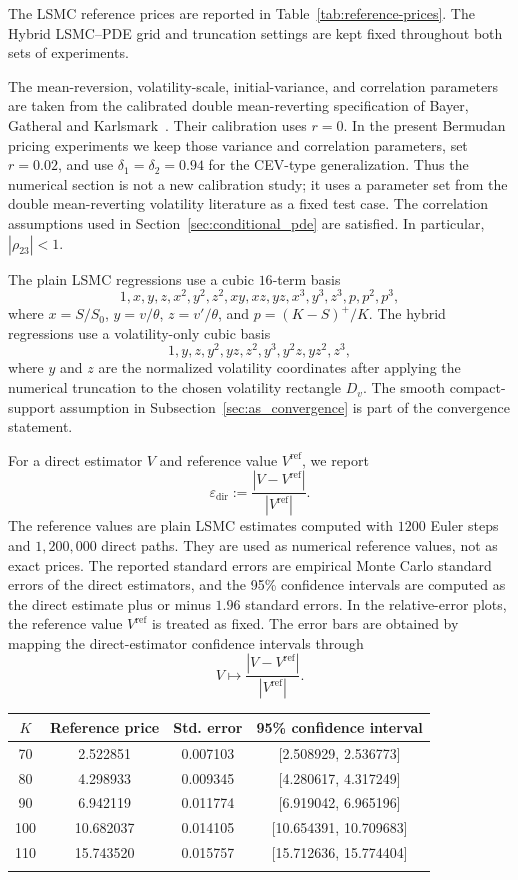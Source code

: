 \documentclass[pdflatex,sn-mathphys-num]{sn-jnl}
\makeatletter
\theoremstyle{thmstyleone}%
\theoremstyle{thmstylethree}%
\theoremstyle{thmstyletwo}%
\renewenvironment{table}[1][]{%
  \par\addvspace{12pt}%
  \noindent\begin{minipage}{\textwidth}%
  \def\@captype{table}%
  \centering%
  \tablebodyfont%
}{%
  \end{minipage}%
  \par\addvspace{12pt}%
}
\makeatother
\begin{document}
The LSMC reference prices are reported in Table~\ref{tab:reference-prices}. The
Hybrid LSMC--PDE grid and truncation settings are kept fixed throughout both
sets of experiments.

The mean-reversion, volatility-scale, initial-variance, and correlation
parameters are taken from the calibrated double mean-reverting specification of
Bayer, Gatheral and Karlsmark~\citep{bayer2013fast}. Their calibration uses
$r=0$. In the present Bermudan pricing experiments we keep those variance and
correlation parameters, set $r=0.02$, and use
$\delta_1=\delta_2=0.94$ for the CEV-type generalization. Thus the numerical
section is not a new calibration study; it uses a parameter set from the double
mean-reverting volatility literature as a fixed test case.
The correlation assumptions used in Section~\ref{sec:conditional_pde} are
satisfied. In particular, $|\rho_{23}|<1$.

The plain LSMC regressions use a cubic $16$-term basis
$$
1,x,y,z,x^2,y^2,z^2,xy,xz,yz,x^3,y^3,z^3,p,p^2,p^3,
$$
where $x=S/S_0$, $y=v/\theta$, $z=v'/\theta$, and
$p=(K-S)^+/K$. The hybrid regressions use a volatility-only cubic basis
$$
1,y,z,y^2,yz,z^2,y^3,y^2z,yz^2,z^3,
$$
where $y$ and $z$ are the normalized volatility coordinates after applying
the numerical truncation to the chosen volatility rectangle $D_v$. The smooth
compact-support assumption in Subsection~\ref{sec:as_convergence} is part of
the convergence statement.

For a direct estimator $V$ and reference value $V^{\mathrm{ref}}$, we report
$$
\varepsilon_{\mathrm{dir}}
:=
\frac{|V-V^{\mathrm{ref}}|}{|V^{\mathrm{ref}}|}.
$$
The reference values are plain LSMC estimates computed with $1200$
Euler steps and $1{,}200{,}000$ direct paths. They are used as numerical
reference values, not as exact prices. The reported standard errors are
empirical Monte Carlo standard errors of the direct estimators, and the
95\% confidence intervals are computed as the direct estimate plus or minus
$1.96$ standard errors. In the relative-error
plots, the reference value
$V^{\mathrm{ref}}$ is treated as fixed. The error bars are obtained by mapping
the direct-estimator confidence intervals through
$$
V\mapsto \frac{|V-V^{\mathrm{ref}}|}{|V^{\mathrm{ref}}|}.
$$
\begin{table}[htbp]
\centering
\caption{Direct LSMC reference values for the parameter set in Table~\ref{tab:parameter-setup}.}
\label{tab:reference-prices}
\small
\begin{tabularx}{0.82\textwidth}{@{}cccc@{}}
\toprule
$K$ & Reference price & Std. error & 95\% confidence interval \\
\midrule
70 & 2.522851 & 0.007103 & [2.508929, 2.536773] \\
80 & 4.298933 & 0.009345 & [4.280617, 4.317249] \\
90 & 6.942119 & 0.011774 & [6.919042, 6.965196] \\
100 & 10.682037 & 0.014105 & [10.654391, 10.709683] \\
110 & 15.743520 & 0.015757 & [15.712636, 15.774404] \\
\botrule
\end{tabularx}
\end{table}
\end{document}

